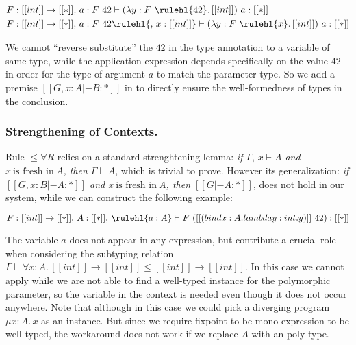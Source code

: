 \begin{align*}
& F : [[int]] \rightarrow [[*]],\, a : F~42  \vdash (\lambda y : F~\rulehl{42}.\, [[int]]) ~ a : [[*]] \\
& F : [[int]] \rightarrow [[*]],\, a : F~42  \rulehl{,\, x : [[int]]} \vdash (\lambda y : F~\rulehl{x}.\, [[int]]) ~ a : [[*]]
\end{align*}

We cannot ``reverse substitute'' the $42$ in the type annotation to a variable
of same type, while the application expression depends specifically on the value
$42$ in order for the type of argument $a$ to match the parameter type.
So we add a premise $[[G , x : A |- B : *]]$ in  to directly
ensure the well-formedness of types in the conclusion.

\subsubsection{Strengthening of Contexts.}

Rule $\le\forall R$ relies on a standard strenghtening lemma:
\emph{if $\Gamma,\, x \vdash A$ and $x ~\text{is fresh in}~ A$, then $\Gamma \vdash A$}, which
is trivial to prove.
However its generalization:
\emph{if $[[G, x : B |- A : *]]$ and $x ~\text{is fresh in}~ A$, then $[[G |- A : *]]$},
does not hold in our system, while we can construct the following example:

\begin{equation*}
    F : [[int]] \rightarrow [[*]],\, A : [[*]],\, \rulehl{a : A} \vdash F ~ ([[(bind x : A. lambda y : int. y)]]~ 42) : [[*]]
\end{equation*}

The variable $a$ does not appear in any expression, but contribute a
crucial role when considering the subtyping relation $\Gamma \vdash \forall x : A.\, [[int]] \rightarrow [[int]] \le [[int]] \rightarrow [[int]]$.
In this case we cannot apply  while we are not able to find a
well-typed instance for the polymorphic parameter, so the variable in the context
is needed even though it does not occur anywhere. Note that although in this
case we could pick a diverging program $\mu x : A.\, x$ as an instance. But
since we require fixpoint to be mono-expression to be well-typed, the workaround
does not work if we replace $A$ with an poly-type.

